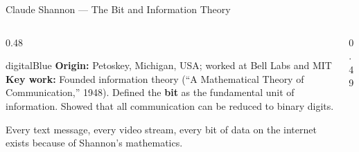 \begin{frame}[shrink=2]{Claude Shannon --- The Bit and Information Theory}

  \begin{columns}[T]
    \begin{column}{0.48\textwidth}
      \begin{personbox}{digitalBlue}
        \textbf{Origin:} Petoskey, Michigan, USA; worked at Bell Labs and MIT\\[3pt]
        \textbf{Key work:} Founded \alert{information theory}
        (``A Mathematical Theory of Communication,'' 1948). Defined the
        \textbf{bit} as the fundamental unit of information. Showed that
        all communication can be reduced to binary digits.
      \end{personbox}

      \vspace{0.4em}
      \begin{insightbox}
        Every text message, every video stream, every bit of data on the
        internet exists because of Shannon's mathematics.
      \end{insightbox}
    \end{column}

    \begin{column}{0.49\textwidth}
    \end{column}
  \end{columns}

\end{frame}

